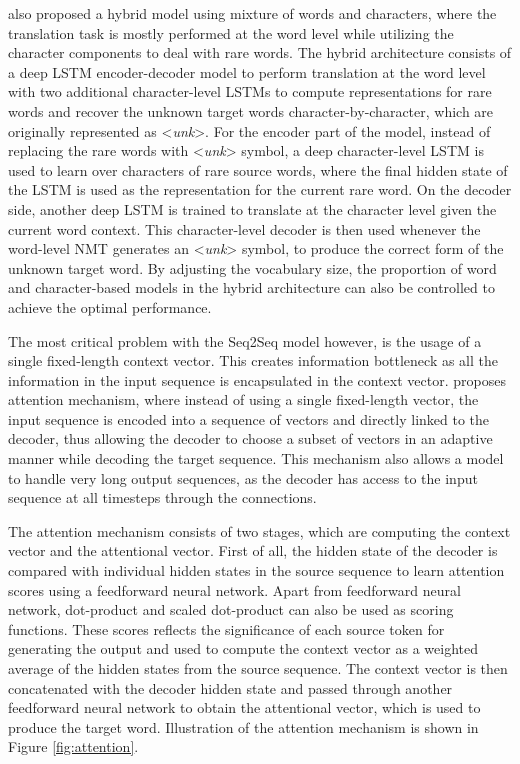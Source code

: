 \documentclass[12pt]{extarticle}
\begin{document}
\citep{luong-manning-2016-achieving} also proposed a hybrid model using mixture of words and characters, where the translation task is mostly performed at the word level while utilizing the character components to deal with rare words. The hybrid architecture consists of a deep LSTM encoder-decoder model to perform translation at the word level with two additional character-level LSTMs to compute representations for rare words and recover the unknown target words character-by-character, which are originally represented as \textless \textit{unk}\textgreater{}. For the encoder part of the model, instead of replacing the rare words with \textless \textit{unk}\textgreater{} symbol, a deep character-level LSTM is used to learn over characters of rare source words, where the final hidden state of the LSTM is used as the representation for the current rare word. On the decoder side, another deep LSTM is trained to translate at the character level given the current word context. This character-level decoder is then used whenever the word-level NMT generates an \textless \textit{unk}\textgreater{} symbol, to produce the correct form of the unknown target word. By adjusting the vocabulary size, the proportion of word and character-based models in the hybrid architecture can also be controlled to achieve the optimal performance.

The most critical problem with the Seq2Seq model however, is the usage of a single fixed-length context vector. This creates information bottleneck as all the information in the input sequence is encapsulated in the context vector. \citep{DBLP:journals/corr/BahdanauCB14} proposes attention mechanism, where instead of using a single fixed-length vector, the input sequence is encoded into a sequence of vectors and directly linked to the decoder, thus allowing the decoder to choose a subset of vectors in an adaptive manner while decoding the target sequence. This mechanism also allows a model to handle very long output sequences, as the decoder has access to the input sequence at all timesteps through the connections.

The attention mechanism consists of two stages, which are computing the context vector and the attentional vector. First of all, the hidden state of the decoder is compared with individual hidden states in the source sequence to learn attention scores using a feedforward neural network. Apart from feedforward neural network, dot-product \citep{luong-etal-2015-effective} and scaled dot-product \citep{NIPS2017_7181} can also be used as scoring functions. These scores reflects the significance of each source token for generating the output and used to compute the context vector as a weighted average of the hidden states from the source sequence. The context vector is then concatenated with the decoder hidden state and passed through another feedforward neural network to obtain the attentional vector, which is used to produce the target word. Illustration of the attention mechanism is shown in Figure \ref{fig:attention}.
\end{document}
